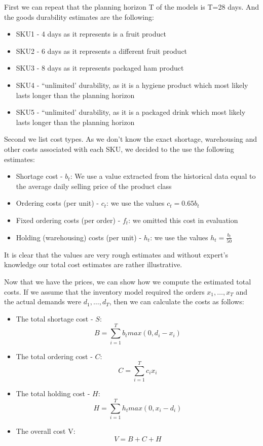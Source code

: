 \documentclass[11pt,a4paper]{article}
\begin{document}
First we can repeat that the planning horizon T of the models is T=28 days. And the goods durability estimates are the following:
\begin{itemize}
\item SKU1 - 4 days as it represents is a fruit product
\item SKU2 - 6 days as it represents a different fruit product
\item SKU3 - 8 days as it represents packaged ham product
\item SKU4 - ``unlimited' durability, as it is a hygiene product which most likely lasts longer than the planning horizon
\item SKU5 - ``unlimited' durability, as it is a packaged drink which most likely lasts longer than the planning horizon

\end{itemize}
Second we list cost types. As we don't know the exact shortage, warehousing and other costs associated with each SKU, we decided to the use the following estimates:

\begin{itemize}
\item Shortage cost - $b_t$: We use a value extracted from the historical data equal to the average daily selling price of the product class
\item Ordering costs (per unit) - $c_t$: we use the values $c_t = 0.65b_t$
\item Fixed ordering costs (per order) - $f_t$: we omitted this cost in evaluation
\item Holding (warehousing) costs (per unit) - $h_t$: we use the values $h_t = \frac{b_t}{50}$
\end{itemize} 
It is clear that the values are very rough estimates and without expert's knowledge our total cost estimates are rather illustrative. 

Now that we have the prices, we can show how we compute the estimated total costs. If we assume that the inventory model required the orders $x_1,\dots,x_T$ and the actual demands were $d_1,\dots,d_T$, then we can calculate the costs as follows:
\begin{itemize}
\item The total shortage cost - $S$: 
\begin{equation}
B = \sum\limits_{i=1}^T b_t max(0, d_i - x_i)
\end{equation}
\item The total ordering cost - $C$: 
\begin{equation}
C = \sum\limits_{i=1}^T c_i x_i 
\end{equation}
\item The total holding cost - $H$: 
\begin{equation}
H = \sum\limits_{i=1}^T h_t max(0, x_i - d_i)
\end{equation}
\item The overall cost V:
\begin{equation}
V = B + C + H
\end{equation}


\end{itemize}
\end{document}
